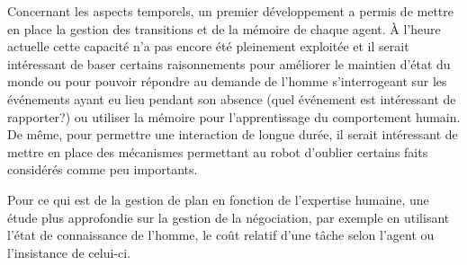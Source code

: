 \documentclass[a4paper,11pt,twoside]{StyleThese}
\begin{document}
Concernant les aspects temporels, un premier développement a permis de mettre en place la gestion des transitions et de la mémoire de chaque agent. À l'heure actuelle cette capacité n'a pas encore été pleinement exploitée et il serait intéressant de baser certains raisonnements pour améliorer le maintien d'état du monde ou pour pouvoir répondre au demande de l'homme s'interrogeant sur les événements ayant eu lieu pendant son absence (quel événement est intéressant de rapporter?) ou utiliser la mémoire pour l'apprentissage du comportement humain. De même, pour permettre une interaction de longue durée, il serait intéressant de mettre en place des mécanismes permettant au robot d'oublier certains faits considérés comme peu importants.

Pour ce qui est de la gestion de plan en fonction de l'expertise humaine, une étude plus approfondie sur la gestion de la négociation, par exemple en utilisant l'état de connaissance de l'homme, le coût relatif d'une tâche selon l'agent ou l'insistance de celui-ci.
 

\ifdefined{}
\else


\end{document}
